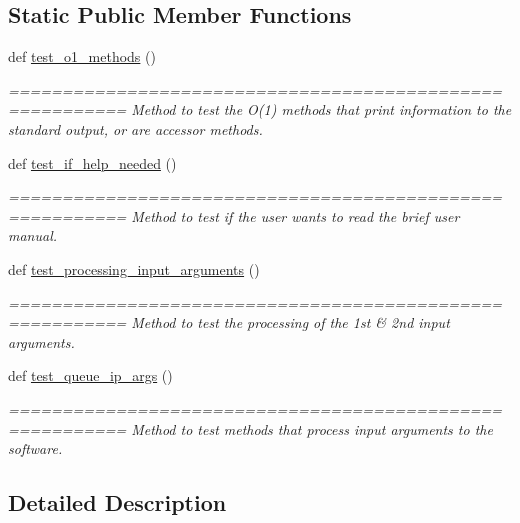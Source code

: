 \subsection*{Static Public Member Functions}
\begin{DoxyCompactItemize}
\item 
def \hyperlink{classutilities_1_1queue__ip__arguments__tester_1_1queue__ip__args__tester_a49bd049dbf616cc1f604d3c0cbe84c43}{test\+\_\+o1\+\_\+methods} ()
\begin{DoxyCompactList}\small\item\em ========================================================= Method to test the O(1) methods that print information to the standard output, or are accessor methods. \end{DoxyCompactList}\item 
def \hyperlink{classutilities_1_1queue__ip__arguments__tester_1_1queue__ip__args__tester_a4af9d2177916d79d95fc9de5531162af}{test\+\_\+if\+\_\+help\+\_\+needed} ()
\begin{DoxyCompactList}\small\item\em ========================================================= Method to test if the user wants to read the brief user manual. \end{DoxyCompactList}\item 
def \hyperlink{classutilities_1_1queue__ip__arguments__tester_1_1queue__ip__args__tester_a53e53ec2797918a6488b0d75ba437407}{test\+\_\+processing\+\_\+input\+\_\+arguments} ()
\begin{DoxyCompactList}\small\item\em ========================================================= Method to test the processing of the 1st \& 2nd input arguments. \end{DoxyCompactList}\item 
def \hyperlink{classutilities_1_1queue__ip__arguments__tester_1_1queue__ip__args__tester_aee90077323d94238d7f81b23e31207c3}{test\+\_\+queue\+\_\+ip\+\_\+args} ()
\begin{DoxyCompactList}\small\item\em ========================================================= Method to test methods that process input arguments to the software. \end{DoxyCompactList}\end{DoxyCompactItemize}


\subsection{Detailed Description}


